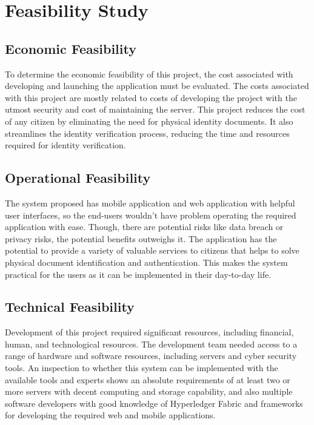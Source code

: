 \section{Feasibility Study}
\subsection{Economic Feasibility}
To determine the economic feasibility of this project, the cost associated with developing and launching the application must be evaluated. The costs associated with this project are mostly related to costs of developing the project with the utmost security and cost of maintaining the server. This project reduces the cost of any citizen by eliminating the need for physical identity documents. It also streamlines the identity verification process, reducing the time and resources required for identity verification.

\subsection{Operational Feasibility}
The system proposed has mobile application and web application with helpful user interfaces, so the end-users wouldn't have problem operating the required application with ease. Though, there are potential risks like data breach or privacy risks, the potential benefits outweighs it. The application has the potential to provide a variety of valuable services to citizens that helps to solve physical document identification and authentication. This makes the system practical for the users as it can be implemented in their day-to-day life.

\subsection{Technical Feasibility}
Development of this project required significant resources, including financial, human, and technological resources. The development team needed access to a range of hardware and software resources, including servers and cyber security tools. An inspection to whether this system can be implemented with the available tools and experts shows an absolute requirements of at least two or more servers with decent computing and storage capability, and also multiple software developers with good knowledge of Hyperledger Fabric and frameworks for developing the required web and mobile applications.





